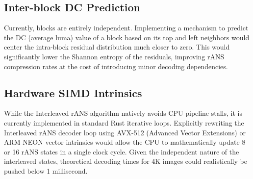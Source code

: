 \subsection{Inter-block DC Prediction}
Currently, blocks are entirely independent. Implementing a mechanism to predict the DC (average luma) value of a block based on its top and left neighbors would center the intra-block residual distribution much closer to zero. This would significantly lower the Shannon entropy of the residuals, improving rANS compression rates at the cost of introducing minor decoding dependencies.

\subsection{Hardware SIMD Intrinsics}
While the Interleaved rANS algorithm natively avoids CPU pipeline stalls, it is currently implemented in standard Rust iterative loops. Explicitly rewriting the Interleaved rANS decoder loop using AVX-512 (Advanced Vector Extensions) or ARM NEON vector intrinsics would allow the CPU to mathematically update 8 or 16 rANS states in a single clock cycle. Given the independent nature of the interleaved states, theoretical decoding times for 4K images could realistically be pushed below 1 millisecond.
